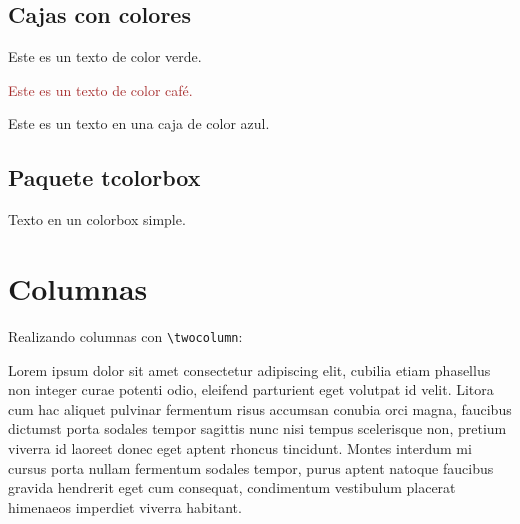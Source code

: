 \documentclass{article}
\begin{document}
		
		\subsection{Cajas con colores}
		
		\textcolor{applegreen}{Este es un texto de color verde.}
		
		\textcolor{brown}{Este es un texto de color café.}
		
		\colorbox{non-photoblue}{Este es un texto en una caja de color azul.}
		
		
		
		\subsection{Paquete \ttfamily tcolorbox}
		
		\begin{tcolorbox}[
				colback = orange!30, %
				colframe = red,		 %
				arc = 5mm,			 %
				width = 0.7\textwidth, %
				height = 40pt,		 %
				boxrule = 5pt,		 %
				enhanced jigsaw,	 %
				drop shadow = {green!30}
			]
			Texto en un colorbox simple.
		\end{tcolorbox}
	\section {Columnas}

	Realizando columnas con \verb|\twocolumn|:
	\twocolumn 

	Lorem ipsum dolor sit amet consectetur adipiscing elit, cubilia etiam phasellus non integer curae potenti odio, eleifend parturient eget volutpat id velit. Litora cum hac aliquet pulvinar fermentum risus accumsan conubia orci magna, faucibus dictumst porta sodales tempor sagittis nunc nisi tempus scelerisque non, pretium viverra id laoreet donec eget aptent rhoncus tincidunt. Montes interdum mi cursus porta nullam fermentum sodales tempor, purus aptent natoque faucibus gravida hendrerit eget cum consequat, condimentum vestibulum placerat himenaeos imperdiet viverra habitant.
		
\end{document}
